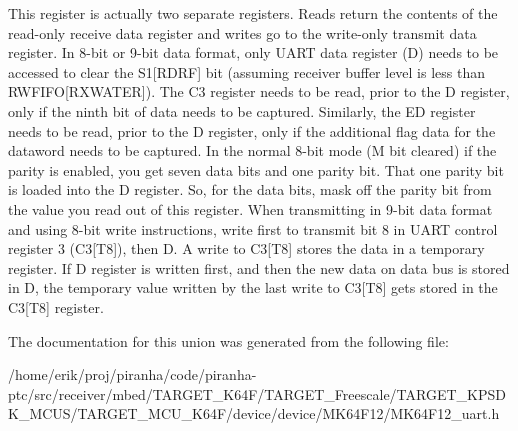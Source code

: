 This register is actually two separate registers. Reads return the contents of the read-\/only receive data register and writes go to the write-\/only transmit data register. In 8-\/bit or 9-\/bit data format, only U\+A\+RT data register (D) needs to be accessed to clear the S1\mbox{[}R\+D\+RF\mbox{]} bit (assuming receiver buffer level is less than R\+W\+F\+I\+FO\mbox{[}R\+X\+W\+A\+T\+ER\mbox{]}). The C3 register needs to be read, prior to the D register, only if the ninth bit of data needs to be captured. Similarly, the ED register needs to be read, prior to the D register, only if the additional flag data for the dataword needs to be captured. In the normal 8-\/bit mode (M bit cleared) if the parity is enabled, you get seven data bits and one parity bit. That one parity bit is loaded into the D register. So, for the data bits, mask off the parity bit from the value you read out of this register. When transmitting in 9-\/bit data format and using 8-\/bit write instructions, write first to transmit bit 8 in U\+A\+RT control register 3 (C3\mbox{[}T8\mbox{]}), then D. A write to C3\mbox{[}T8\mbox{]} stores the data in a temporary register. If D register is written first, and then the new data on data bus is stored in D, the temporary value written by the last write to C3\mbox{[}T8\mbox{]} gets stored in the C3\mbox{[}T8\mbox{]} register. 

The documentation for this union was generated from the following file\+:\begin{DoxyCompactItemize}
\item 
/home/erik/proj/piranha/code/piranha-\/ptc/src/receiver/mbed/\+T\+A\+R\+G\+E\+T\+\_\+\+K64\+F/\+T\+A\+R\+G\+E\+T\+\_\+\+Freescale/\+T\+A\+R\+G\+E\+T\+\_\+\+K\+P\+S\+D\+K\+\_\+\+M\+C\+U\+S/\+T\+A\+R\+G\+E\+T\+\_\+\+M\+C\+U\+\_\+\+K64\+F/device/device/\+M\+K64\+F12/M\+K64\+F12\+\_\+uart.\+h\end{DoxyCompactItemize}
